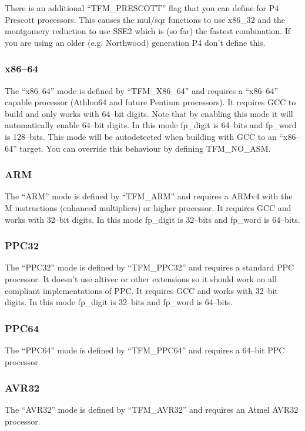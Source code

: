 \documentclass[b5paper]{book}
\begin{document}
There is an additional ``TFM\_PRESCOTT'' flag that you can define for P4 Prescott processors.  This causes
the mul/sqr functions to use x86\_32 and the montgomery reduction to use SSE2 which is (so far) the fastest
combination.  If you are using an older (e.g. Northwood) generation P4 don't define this.

\subsubsection{x86--64}  The ``x86--64'' mode is defined by ``TFM\_X86\_64'' and requires a 
``x86--64'' capable processor (Athlon64 and future Pentium processors).  It requires GCC to
build and only works with 64--bit digits.  Note that by enabling this mode it will automatically
enable 64--bit digits.  In this mode fp\_digit is 64--bits and fp\_word is 128--bits.  This mode will
be autodetected when building with GCC to an ``x86--64'' target.  You can override this behaviour by defining
TFM\_NO\_ASM.

\subsubsection{ARM}  The ``ARM'' mode is defined by ``TFM\_ARM'' and requires a ARMv4 with the M instructions (enhanced 
multipliers) or higher processor.  It requires GCC and works with 32--bit digits.  In this mode fp\_digit is 32--bits and 
fp\_word is 64--bits.

\subsubsection{PPC32} The ``PPC32'' mode is defined by ``TFM\_PPC32'' and requires a standard PPC processor.  It doesn't 
use altivec or other extensions so it should work on all compliant implementations of PPC.  It requires GCC and works
with 32--bit digits.  In this mode fp\_digit is 32--bits and fp\_word is 64--bits.

\subsubsection{PPC64} The ``PPC64'' mode is defined by ``TFM\_PPC64'' and requires a 64--bit PPC processor.  

\subsubsection{AVR32} The ``AVR32'' mode is defined by ``TFM\_AVR32'' and requires an Atmel AVR32 processor.  
\end{document}
